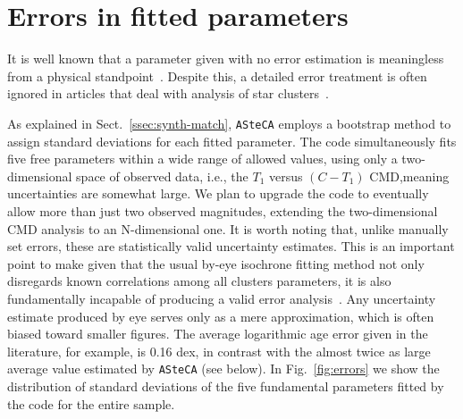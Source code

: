\documentclass{aa}
\begin{document}

\section{Errors in fitted parameters}
\label{sec:errors-fit}

It is well known that a parameter given with no error estimation is
meaningless from a physical standpoint~\citep{Dolphin_2002,Andrae_2010}.
%
Despite this, a detailed error treatment is often ignored in
articles that deal with analysis of star clusters~\citep{Paunzen_2006}.

As explained in Sect.~\ref{ssec:synth-match}, \texttt{ASteCA} employs a
bootstrap method to assign standard deviations for each fitted parameter.
%
The code simultaneously fits five free parameters within a wide range of allowed
values, using only a two-dimensional space of observed data, i.e., the $T_1$
versus $ (C-T_1)$ CMD,\@ meaning uncertainties are somewhat large.
We plan to upgrade the code to eventually allow more than just two observed
magnitudes, extending the two-dimensional CMD analysis to an N-dimensional one.
%
It is worth noting that, unlike manually set errors, these are
statistically valid uncertainty estimates. This is an important point to make
given that the usual by-eye isochrone fitting method not only disregards known
correlations among all clusters parameters, it is also fundamentally incapable
of producing a valid error analysis~\citep{Naylor_2006}. Any uncertainty
estimate produced by eye serves only as a mere approximation, which is often
biased toward smaller figures. The average logarithmic age error given in
the literature, for example, is 0.16 dex, in contrast with the almost twice as
large average value estimated by \texttt{ASteCA} (see below).
%
In Fig.~\ref{fig:errors} we show the distribution of standard deviations
of the five fundamental parameters fitted by the code for the entire sample.
\end{document}
